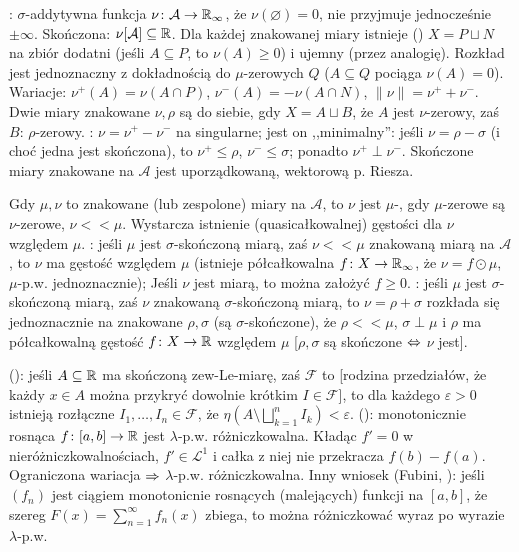 :  $\sigma$-addytywna funkcja $\nu \colon \mathcal A \to \mathbb{R}_\infty$, że $\nu(\varnothing) = 0$, nie przyjmuje jednocześnie $\pm \infty$.
Skończona: $\nu[\mathcal A] \subseteq \mathbb{R}$.
Dla każdej znakowanej miary istnieje   () $X = P \sqcup N$ na zbiór dodatni (jeśli $A \subseteq P$, to $\nu(A) \ge 0$) i ujemny (przez analogię).
Rozkład jest jednoznaczny z dokładnością do $\mu$-zerowych $Q$ ($A \subseteq Q$ pociąga $\nu(A) = 0$).
Wariacje: $\nu^+(A) = \nu(A \cap P)$, $\nu^-(A) = - \nu(A \cap N)$, $\|\nu\| = \nu^+ + \nu^-$.
Dwie miary znakowane $\nu, \rho$ są  do siebie, gdy $X = A \sqcup B$, że $A$ jest $\nu$-zerowy, zaś $B$: $\rho$-zerowy.
: $\nu = \nu^+ - \nu^-$ na singularne; jest on ,,minimalny'': jeśli $\nu = \rho - \sigma$ (i choć jedna jest skończona), to $\nu^+ \le \rho$, $\nu^- \le \sigma$; ponadto $\nu^+ \perp \nu^-$.
Skończone miary znakowane na $\mathcal A$ jest uporządkowaną, wektorową p. Riesza.

Gdy  $\mu, \nu$ to znakowane (lub zespolone) miary na $\mathcal A$, to $\nu$ jest $\mu$-, gdy $\mu$-zerowe są $\nu$-zerowe, $\nu << \mu$.
Wystarcza istnienie (quasicałkowalnej) gęstości dla $\nu$ względem $\mu$.
: jeśli $\mu$ jest $\sigma$-skończoną miarą, zaś $\nu << \mu$ znakowaną miarą na $\mathcal A$, to $\nu$ ma gęstość względem $\mu$ (istnieje półcałkowalna $f \colon X \to \mathbb{R}_\infty$, że $\nu = f \odot \mu$, $\mu$-p.w. jednoznacznie);
Jeśli $\nu$ jest miarą, to można założyć $f \ge 0$.
: jeśli $\mu$ jest $\sigma$-skończoną miarą, zaś $\nu$ znakowaną $\sigma$-skończoną miarą, to $\nu = \rho + \sigma$ rozkłada się jednoznacznie na znakowane $\rho, \sigma$ (są $\sigma$-skończone), że $\rho << \mu$, $\sigma \perp \mu$ i $\rho$ ma półcałkowalną gęstość $f \colon X \to \mathbb{R}$ względem $\mu$ [$\rho, \sigma$ są skończone $\Leftrightarrow$ $\nu$ jest].

  (): jeśli $A \subseteq \mathbb{R}$ ma skończoną zew-Le-miarę, zaś $\mathcal F$ to  [rodzina przedziałów, że każdy $x \in A$ można przykryć dowolnie krótkim $I \in \mathcal F$], to dla każdego $\varepsilon > 0$ istnieją rozłączne $I_1, \dots, I_n \in \mathcal F$, że $\eta(A \setminus \bigsqcup_{k=1}^n I_k) < \varepsilon$.
 (): monotonicznie rosnąca $f \colon [a,b] \to \mathbb{R}$ jest $\lambda$-p.w. różniczkowalna.
Kładąc $f' = 0$ w nieróżniczkowalnościach, $f' \in \mathcal L^1$ i całka z niej nie przekracza $f(b) - f(a)$.
Ograniczona wariacja $\Rightarrow$ $\lambda$-p.w. różniczkowalna.
Inny wniosek (Fubini, ): jeśli $(f_n)$ jest ciągiem monotonicnie rosnących (malejących) funkcji na $[a,b]$, że szereg $F(x) = \sum_{n=1}^\infty f_n(x)$ zbiega, to można różniczkować wyraz po wyrazie $\lambda$-p.w.

